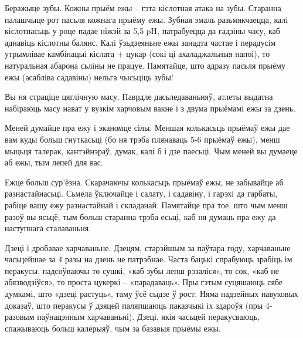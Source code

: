 Беражыце зубы.
Кожны прыём ежы – гэта кіслотная атака на зубы. Старанна палашчыце рот пасьля кожнага прыёму ежы. Зубная эмаль разьмякчаецца, калі кіслотнасьць у роце падае ніжэй за 5,5 pH, патрабуецца да гадзіны часу, каб аднавіць кіслотны балянс. Калі ўзьдзеяньне ежы занадта частае і перадусім утрымлівае камбінацыі кіслата + цукар (сокі ці ахаладжальныя напоі), то натуральная абарона сьліны не працуе. Памятайце, што адразу пасьля прыёму ежы (асабліва садавіны) нельга чысьціць зубы!

Вы ня страціце цяглічную масу.
Паврдле дасьледаваньняў, атлеты выдатна набіраюць масу нават у вузкім харчовым вакне і з двума прыёмамі ежы за дзень.

Меней думайце пра ежу і эканомце сілы.
Меншая колькасьць прыёмаў ежы дае вам куды больш гнуткасьці (бо ня трэба плянаваць 5-6 прыёмаў ежы), менш мыцьця талерак, кантэйнэраў, думак, калі б і дзе паесьці. Чым меней вы думаеце аб ежы, тым лепей для вас.

Ежце больш сур'ёзна.
Скарачаючы колькасьць прыёмаў ежы, не забывайце аб разнастайнасьці. Сьмела ўключайце і салату, і садавіну, і гарэхі да гарбаты, рабіце вашу ежу разнастайнай і складанай. Памятайце пра тое, што чым менш разоў вы ясьцё, тым больш старанна трэба есьці, каб ня думаць пра ежу да наступнага сталаваньня.

Дзеці і дробавае харчаваньне.
Дзецям, старэйшым за паўтара году, харчаваньне часьцейшае за 4 разы на дзень не патрэбнае. Часта бацькі спрабуюць зрабіць ім перакусы, падсоўваючы то сушкі, «каб зубы лепш рэзаліся», то сок, «каб не абязводзіўся», то проста цукеркі – «парадаваць». Пры гэтым суцяшаюць сябе думкамі, што «дзеці растуць», таму ўсё сыдзе ў рост. Няма надзейных навуковых доказаў, што перакусы ў дзяцей паляпшаюць паказчыкі іх здароўя (пры 4-разовым паўнацэнным харчаваньні). Дзеці, якія часьцей  перакусваюць, спажываюць больш калёрыяў, чым за базавыя прыёмы ежы.
